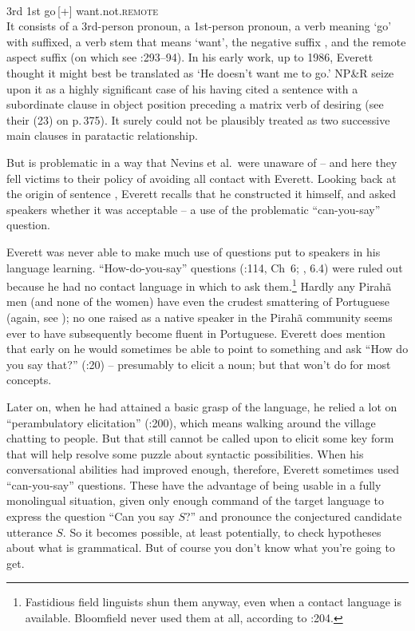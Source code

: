 \documentclass[output=paper,colorlinks,citecolor=brown
]{langscibook}
\begin{document}
\ea\label{ex:pullum:3}
\gll {}    
            \\
         3rd 1st go\,[+] want.not.\textsc{remote}\\
\z
\noindent
It consists of a 3rd-person pronoun, a 1st-person pronoun, a
verb meaning `go' with \mbox{} suffixed, a verb stem that
means `want', the negative suffix , and the remote aspect
suffix  (on which see \citealt{Everett86HAL}:293--94). In
his early work, up to 1986, Everett thought it might best be translated
as `He doesn't want me to go.' NP\&R seize upon it as a highly significant
case of his having cited a sentence with a subordinate clause in
object position preceding a matrix verb of desiring (see their (23)
on p.\,375). It surely could not be plausibly treated as two successive
main clauses in paratactic relationship.

But  is problematic in a way that Nevins et al.\ were unaware
of -- and here they fell victims to their policy of avoiding all contact
with Everett. Looking back at the origin of sentence , Everett recalls
that he constructed it himself, and asked speakers whether it was
acceptable -- a use of the problematic ``can-you-say'' question.

Everett was never able to make much use of questions put to speakers
in his language learning.  ``How-do-you-say'' questions
(\citealt{Samarin67}:114, Ch~6; \citealt{SakeEver12},
{\textsection}6.4) were ruled out because he had no contact language in
which to ask them.\footnote{%
   Fastidious field linguists shun them anyway, even when a contact language
   is available. Bloomfield never used them at all, according to
   \citealt{Voegelin60}:204.}
Hardly any Pirah{\~a} men (and none of the women) have even the crudest
smattering of Portuguese (again, see \citealt{Sakel12}); no one raised
as a native speaker in the Pirah{\~a} community seems ever to have
subsequently become fluent in Portuguese. Everett does mention that
early on he would sometimes be able to point to something and ask
``How do you say that?'' (\citealt{Everett08}:20) -- presumably
to elicit a noun; but that won't do for most concepts.

Later on, when he had attained a basic grasp of the language, he relied
a lot on ``perambulatory elicitation'' (\citealt{Everett86HAL}:200), which
means walking around the village chatting to people. But that still
cannot be called upon to elicit some key form that will help resolve
some puzzle about syntactic possibilities. When his conversational
abilities had improved enough, therefore, Everett sometimes used
``can-you-say'' questions. These have the advantage of being usable in
a fully monolingual situation, given only enough command of the target
language to express the question ``Can you say $S$?'' and pronounce the
conjectured candidate utterance $S$. So it becomes possible, at least
potentially, to check hypotheses about what is grammatical. But of
course you don't know what you're going to get.
\end{document}
